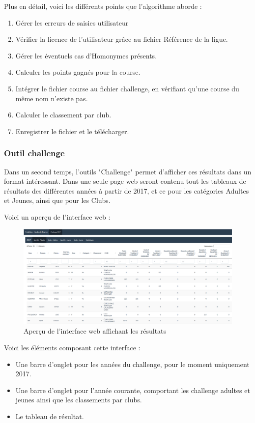 Plus en détail, voici les différents points que l'algorithme aborde :

\begin{enumerate} 
	\item Gérer les erreurs de saisies utilisateur
	\item Vérifier la licence de l'utilisateur grâce au fichier Référence de la ligue.
	\item Gérer les éventuels cas d'Homonymes présents.
	\item Calculer les points gagnés pour la course.
	\item Intégrer le fichier course au fichier challenge, en vérifiant qu'une course du même nom n'existe pas.
	\item Calculer le classement par club.
	\item Enregistrer le fichier et le télécharger.
\end{enumerate}

\subsubsection{Outil challenge}

Dans un second temps, l'outils "Challenge" permet d'afficher ces résultats dans un format intéressant.
Dans une seule page web seront contenu tout les tableaux de résultats des différentes années à partir de 2017, et ce pour les catégories Adultes et Jeunes, ainsi que pour les Clubs.

Voici un aperçu de l'interface web :

\begin{figure}[!h]
	\center
	\includegraphics[scale=0.45]{img/online.PNG}
	\caption {Aperçu de l'interface web affichant les résultats}
\end{figure}

Voici les éléments composant cette interface :

\begin{itemize} 
	\item Une barre d'onglet pour les années du challenge, pour le moment uniquement 2017.
	\item Une barre d'onglet pour l'année courante, comportant les challenge adultes et jeunes ainsi que les classements par clubs.
	\item Le tableau de résultat.
\end{itemize}

